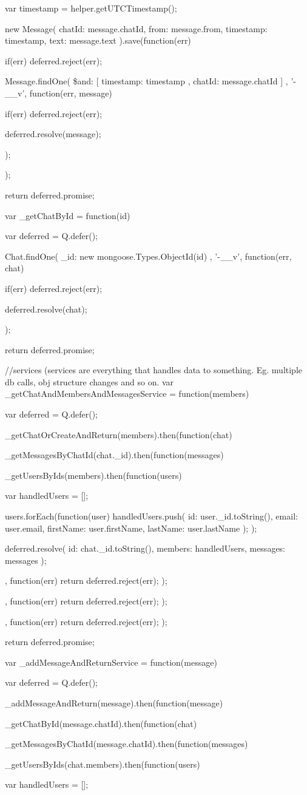 \begin{flushleft}
{	var timestamp = helper.getUTCTimestamp();
	
	new Message({
		chatId: message.chatId,
		from: message.from,
		timestamp: timestamp,
		text: message.text
	}).save(function(err) {
	if(err)
	deferred.reject(err);
	
	Message.findOne(
	{ \$and: [{ timestamp: timestamp }, { chatId: message.chatId }] }
	, '-\_\_v',
	function(err, message) {
		if(err)
		deferred.reject(err);
		
		deferred.resolve(message);
	});
	
	
	
});

return deferred.promise;
}

var \_getChatById = function(id) {
	var deferred = Q.defer();
	
	Chat.findOne({ \_id: new mongoose.Types.ObjectId(id) }, '-\_\_v', function(err, chat) {
		if(err)
		deferred.reject(err);
		
		deferred.resolve(chat);
	});
	
	return deferred.promise;
}

//services (services are everything that handles data to something. Eg. multiple db calls, obj structure changes and so on.
var \_getChatAndMembersAndMessagesService = function(members) {
	var deferred = Q.defer();
	
	\_getChatOrCreateAndReturn(members).then(function(chat) {
		\_getMessagesByChatId(chat.\_id).then(function(messages) {
			\_getUsersByIds(members).then(function(users) {
				var handledUsers = [];
				
				users.forEach(function(user) {
					handledUsers.push({
						id: user.\_id.toString(),
						email: user.email,
						firstName: user.firstName,
						lastName: user.lastName
					});
				});
				
				deferred.resolve({
					id: chat.\_id.toString(),
					members: handledUsers,
					messages: messages
				});
				
			}, function(err) { return deferred.reject(err); });
		}, function(err) { return deferred.reject(err); });
	}, function(err) { return deferred.reject(err); });
	
	return deferred.promise;
}

var \_addMessageAndReturnService = function(message) {
	var deferred = Q.defer();
	
	\_addMessageAndReturn(message).then(function(message){
		\_getChatById(message.chatId).then(function(chat) {
			\_getMessagesByChatId(message.chatId).then(function(messages) {
				\_getUsersByIds(chat.members).then(function(users) {
					var handledUsers = [];
					
}}}}}
\end{flushleft}
